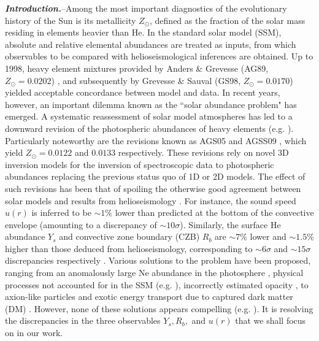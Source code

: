 \documentclass[aps,prl,twocolumn,showpacs]{revtex4}
\begin{document}
\maketitle

\textbf{\textit{Introduction.\/}}\---Among the most important diagnostics of the evolutionary history of the Sun is its metallicity $Z_{\odot}$, defined as the fraction of the solar mass residing in elements heavier than He. In the standard solar model (SSM), absolute and relative elemental abundances are treated as inputs, from which observables to be compared with helioseismological inferences are obtained. Up to 1998, heavy element mixtures provided by Anders \& Grevesse (AG89, $Z_{\odot} = 0.0202$) \citep{ag89}, and subsequently by Grevesse \& Sauval (GS98, $Z_{\odot} = 0.0170$) \cite{gs98} yielded acceptable concordance between model and data. In recent years, however, an important dilemma known as the ``solar abundance problem" has emerged. A systematic reassessment of solar model atmospheres has led to a downward revision of the photospheric abundances of heavy elements (e.g. \cite{ala01,agsa04,caffau,agss15i,agss15ii,agss15iii}). Particularly noteworthy are the revisions known as AGS05 \cite{ags05} and AGSS09 \cite{agss09}, which yield $Z_{\odot} = 0.0122$ and $0.0133$ respectively. These revisions rely on novel 3D inversion models for the inversion of spectroscopic data to photospheric abundances replacing the previous status quo of 1D or 2D models. \newline \indent
%
The effect of such revisions has been that of spoiling the otherwise good agreement between solar models and results from helioseismology \cite{disagreement1,bahcallserenelli1,bahcallserenelli3,disagreement2,penagaray,serenellibasu,bergemann}. For instance, the sound speed $u(r)$ is inferred to be $\sim 1\%$ lower than predicted at the bottom of the convective envelope (amounting to a discrepancy of $\sim 10\sigma$). Similarly, the surface He abundance $Y_s$ and convective zone boundary (CZB) $R_b$ are $\sim 7\%$ lower and $\sim 1.5\%$ higher than those deduced from helioseismology, corresponding to $\sim 6\sigma$ and $\sim 15\sigma$ discrepancies respectively \cite{villante4}. %
Various solutions to the problem have been proposed, ranging from an anomalously large Ne abundance in the photosphere \cite{bahcallneon}, physical processes not accounted for in the SSM (e.g. \cite{lowz1,lowz2,lowz3,mass,effects,solution2,solution3,enhanced1,solution1,yang2016}), incorrectly estimated opacity \cite{solution4,gazit}, to axion-like particles \cite{lightbosons} and exotic energy transport due to captured dark matter (DM) \cite{frandsen,silk,bertone,panci,psq2,psq2long,dev}. However, none of these solutions appears compelling (e.g. \cite{shearer2014}). It is resolving the discrepancies in the three observables $Y_s, R_b,$ and $u(r)$ that we shall focus on in our work. \newline \indent
\end{document}
